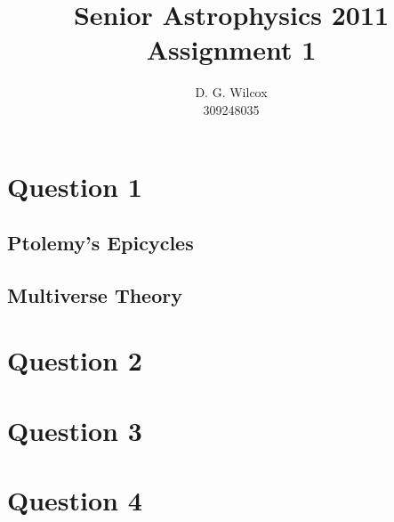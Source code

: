 \documentclass[12pt]{article}
\title{Senior Astrophysics 2011 Assignment 1}
\date{}
\author{D. G. Wilcox \\
	309248035}
\begin{document}
\maketitle
\section*{Question 1}

\subsection*{Ptolemy's Epicycles}

\subsection*{Multiverse Theory}

\section*{Question 2}
\section*{Question 3}
\section*{Question 4}
\end{document}
